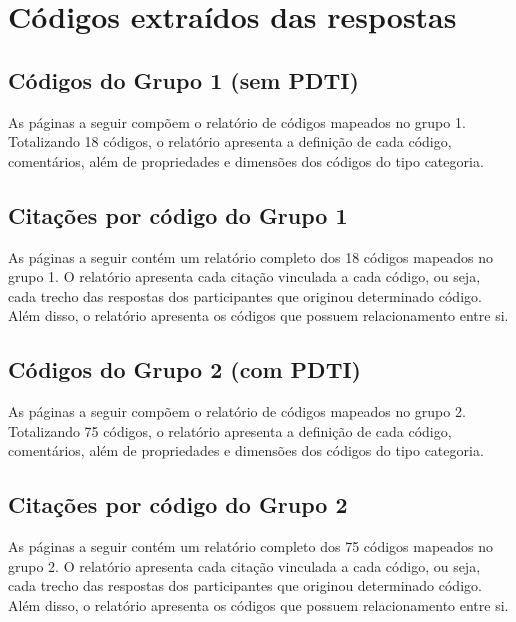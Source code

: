 \chapter{Códigos extraídos das respostas} %
\label{apendice:e_codigos}
\section{Códigos do Grupo 1 (sem PDTI)}
As páginas a seguir compõem o relatório de códigos mapeados no grupo 1. Totalizando 18 códigos, o relatório apresenta a definição de cada código, comentários, além de propriedades e dimensões dos códigos do tipo categoria.




\section{Citações por código do Grupo 1}
As páginas a seguir contém um relatório completo dos 18 códigos mapeados no grupo 1. O relatório apresenta cada citação vinculada a cada código, ou seja, cada trecho das respostas dos participantes que originou determinado código. Além disso, o relatório apresenta os códigos que possuem relacionamento entre si.




\section{Códigos do Grupo 2 (com PDTI)}
As páginas a seguir compõem o relatório de códigos mapeados no grupo 2. Totalizando 75 códigos, o relatório apresenta a definição de cada código, comentários, além de propriedades e dimensões dos códigos do tipo categoria.




\section{Citações por código do Grupo 2}
As páginas a seguir contém um relatório completo dos 75 códigos mapeados no grupo 2. O relatório apresenta cada citação vinculada a cada código, ou seja, cada trecho das respostas dos participantes que originou determinado código. Além disso, o relatório apresenta os códigos que possuem relacionamento entre si.

